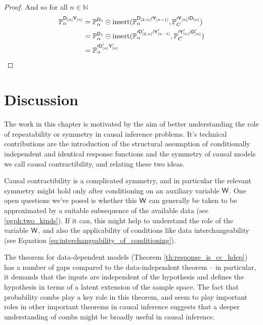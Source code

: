 \begin{proof}
And so for all $n\in \mathbb{N}$
\begin{align}
    \mathbb{P}_\alpha^{\mathsf{D}_{[n]} \mathsf{Y}_{[n]}} &=  \mathbb{P}_\alpha^{\mathsf{D}_1}\odot \text{insert}(\mathbb{P}_\alpha^{ \mathsf{D}_{[2,n]}\wr\mathsf{Y}_{[n-1]}}, \mathbb{P}_C^{\prime \mathsf{Y}_{[n]}\wr\mathsf{D}_{[n]}}) \\
    &= \mathbb{P}_\alpha^{\mathsf{D}_1}\odot \text{insert}(\mathbb{P}_\alpha^{\prime \mathsf{D}'_{[2,n]}\wr\mathsf{Y}'_{[n-1]}}, \mathbb{P}_C^{\prime \mathsf{Y}'_{[n]}\wr\mathsf{D}'_{[n]}}) \\
    &= \mathbb{P}_\alpha^{\prime\mathsf{D}'_{[n]} \mathsf{Y}'_{[n]}}
\end{align}
\end{proof}

\section{Discussion}\label{sec:discussion}

The work in this chapter is motivated by the aim of better understanding the role of repeatability or symmetry in causal inference problems. It's technical contributions are the introduction of the structural assumption of conditionally independent and identical response functions and the symmetry of causal models we call causal contractibility, and relating these two ideas. 

Causal contractibility is a complicated symmetry, and in particular the relevant symmetry might hold only after conditioning on an auxiliary variable $\mathsf{W}$. One open questions we've posed is whether this $\mathsf{W}$ can generally be taken to be approximated by a suitable subsequence of the available data (see \ref{pgph:two_kinds}). If it can, this might help to understand the role of the variable $\mathsf{W}$, and also the applicability of conditions like data interchangeability (see Equation \ref{eq:interchangeability_of_conditioning}).

The theorem for data-dependent models (Theorem \ref{th:response_is_cc_hdep}) has a number of gaps compared to the data-independent theorem -- in particular, it demands that the inputs are independent of the hypothesis and defines the hypothesis in terms of a latent extension of the sample space. The fact that probability combs play a key role in this theorem, and seem to play important roles in other important theorems in causal inference suggests that a deeper understanding of combs might be broadly useful in causal inference.

